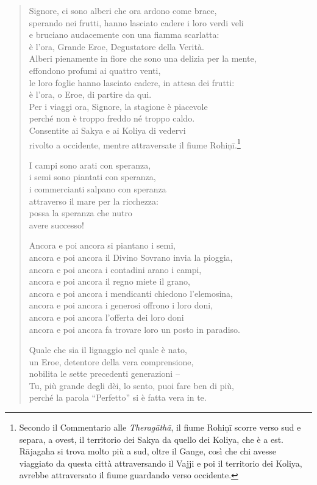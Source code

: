 \begin{quote}
Signore, ci sono alberi che ora ardono come brace, \\
sperando nei frutti, hanno lasciato cadere i loro verdi veli \\
e bruciano audacemente con una fiamma scarlatta: \\
è l’ora, Grande Eroe, Degustatore della Verità. \\
Alberi pienamente in fiore che sono una delizia per la mente, \\
effondono profumi ai quattro venti, \\
le loro foglie hanno lasciato cadere, in attesa dei frutti: \\
è l’ora, o Eroe, di partire da qui. \\
Per i viaggi ora, Signore, la stagione è piacevole \\
perché non è troppo freddo né troppo caldo. \\
Consentite ai Sakya e ai Koliya di vedervi \\
rivolto a occidente, mentre attraversate il fiume
Rohiṇī.\footnote{Secondo il Commentario alle \emph{Theragāthā}, il fiume Rohiṇī scorre verso sud e separa, a ovest, il territorio dei Sakya da quello dei Koliya, che è a est. Rājagaha si trova molto più a sud, oltre il Gange, così che chi avesse viaggiato da questa città attraversando il Vajji e poi il territorio dei Koliya, avrebbe attraversato il fiume guardando verso occidente.}

I campi sono arati con speranza, \\
i semi sono piantati con speranza, \\
i commercianti salpano con speranza \\
attraverso il mare per la ricchezza: \\
possa la speranza che nutro \\
avere successo!

Ancora e poi ancora si piantano i semi, \\
ancora e poi ancora il Divino Sovrano invia la pioggia, \\
ancora e poi ancora i contadini arano i campi, \\
ancora e poi ancora il regno miete il grano, \\
ancora e poi ancora i mendicanti chiedono l’elemosina, \\
ancora e poi ancora i generosi offrono i loro doni, \\
ancora e poi ancora l’offerta dei loro doni \\
ancora e poi ancora fa trovare loro un posto in paradiso.

Quale che sia il lignaggio nel quale è nato, \\
un Eroe, detentore della vera comprensione, \\
nobilita le sette precedenti generazioni – \\
Tu, più grande degli dèi, lo sento, puoi fare ben di più, \\
perché la parola “Perfetto” si è fatta vera in te.
\end{quote}

